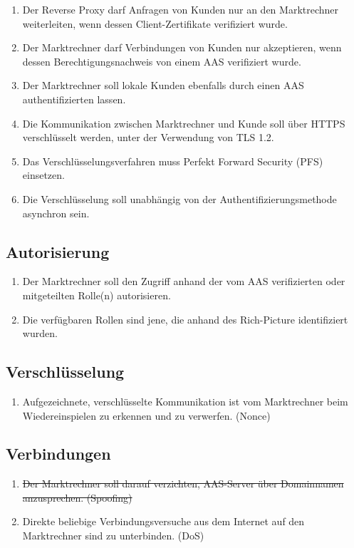 \documentclass[11pt,a4paper]{report}
\begin{document}
\begin{enumerate}
\item[\XBox] Der Reverse Proxy darf Anfragen von Kunden nur an den Marktrechner weiterleiten, wenn dessen Client-Zertifikate verifiziert wurde.
\item[\XBox] Der Marktrechner darf Verbindungen von Kunden nur akzeptieren, wenn dessen Berechtigungsnachweis von einem AAS verifiziert wurde.
\item[\Square] Der Marktrechner soll lokale Kunden ebenfalls durch einen AAS authentifizierten lassen.
\item[\XBox] Die Kommunikation zwischen Marktrechner und Kunde soll über HTTPS verschlüsselt werden, unter der Verwendung von TLS 1.2.
\item[\XBox] Das Verschlüsselungsverfahren muss Perfekt Forward Security (PFS) einsetzen.
\item[\XBox] Die Verschlüsselung soll unabhängig von der Authentifizierungsmethode asynchron sein.
\end{enumerate}

\subsection{Autorisierung}

\begin{enumerate}
\item[\XBox] Der Marktrechner soll den Zugriff anhand der vom AAS verifizierten oder mitgeteilten Rolle(n) autorisieren.
\item[\Square] Die verfügbaren Rollen sind jene, die anhand des Rich-Picture identifiziert wurden.
\end{enumerate}

\subsection{Verschlüsselung}

\begin{enumerate}
\item[\Square] Aufgezeichnete, verschlüsselte Kommunikation ist vom Marktrechner beim Wiedereinspielen zu erkennen und zu verwerfen. (Nonce)
\end{enumerate}

\subsection{Verbindungen}

\begin{enumerate}
\item[\sout{\Square}] \sout{Der Marktrechner soll darauf verzichten, AAS-Server über Domainnamen anzusprechen. (Spoofing)}
\item[\XBox] Direkte beliebige Verbindungsversuche aus dem Internet auf den Marktrechner sind zu unterbinden. (DoS)
\end{enumerate}
\end{document}
